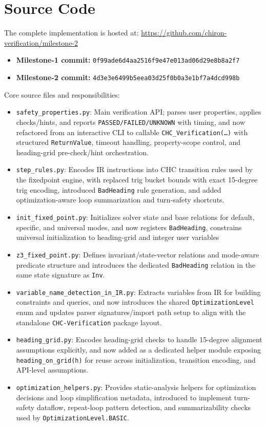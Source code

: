 
\section*{Source Code}

The complete implementation is hosted at:
\url{https://github.com/chiron-verification/milestone-2}

\begin{itemize}[leftmargin=1.5em]
	\item \textbf{Milestone-1 commit:}
	\texttt{0f99ade6d4aa2516f9e47e013ad06d29e8b8a2f7}
	\item \textbf{Milestone-2 commit:}
	\texttt{4d3e3e6499b5eea03d25f0b0a3e1bf7a4dcd998b}
\end{itemize}

\noindent
Core source files and responsibilities:
\begin{itemize}[leftmargin=1.5em]
	\item \texttt{safety\_properties.py}: Main verification API; parses user properties, applies checks/hints, and reports \texttt{PASSED/FAILED/UNKNOWN} with timing, and now refactored from an interactive CLI to callable \texttt{CHC\_Verification(\ldots)} with structured \texttt{ReturnValue}, timeout handling, property-scope control, and heading-grid pre-check/hint orchestration.
	\item \texttt{step\_rules.py}: Encodes IR instructions into CHC transition rules used by the fixedpoint engine, with replaced trig bucket bounds with exact 15-degree trig encoding, introduced \texttt{BadHeading} rule generation, and added optimization-aware loop summarization and turn-safety shortcuts.
	\item \texttt{init\_fixed\_point.py}: Initializes solver state and base relations for default, specific, and universal modes, and now registers \texttt{BadHeading}, constrains universal initialization to heading-grid and integer user variables
	\item \texttt{z3\_fixed\_point.py}: Defines invariant/state-vector relations and mode-aware predicate structure and introduces the dedicated \texttt{BadHeading} relation in the same state signature as \texttt{Inv}.
	\item \texttt{variable\_name\_detection\_in\_IR.py}: Extracts variables from IR for building constraints and queries, and now introduces the shared \texttt{OptimizationLevel} enum and updates parser signatures/import path setup to align with the standalone \texttt{CHC-Verification} package layout.
	\item \texttt{heading\_grid.py}: Encodes heading-grid checks to handle 15-degree alignment assumptions explicitly, and now added as a dedicated helper module exposing \texttt{heading\_on\_grid(h)} for reuse across initialization, transition encoding, and API-level assumptions.
	\item \texttt{optimization\_helpers.py}: Provides static-analysis helpers for optimization decisions and loop simplification metadata, introduced to implement turn-safety dataflow, repeat-loop pattern detection, and summarizability checks used by \texttt{OptimizationLevel.BASIC}.
\end{itemize}

